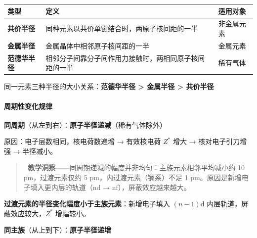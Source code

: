 \documentclass[a4paper,11pt]{ctexart}
\newcounter{none}
\begin{document}
{\def\LTcaptype{none} %
\begin{longtable}[]{@{}
  >{\raggedright\arraybackslash}p{}
  >{\raggedright\arraybackslash}p{}
  >{\raggedright\arraybackslash}p{}@{}}
\toprule\noalign{}
\begin{minipage}[b]{\linewidth}\raggedright
类型
\end{minipage} & \begin{minipage}[b]{\linewidth}\raggedright
定义
\end{minipage} & \begin{minipage}[b]{\linewidth}\raggedright
适用对象
\end{minipage} \\
\midrule\noalign{}
\endhead
\bottomrule\noalign{}
\endlastfoot
\textbf{共价半径} & 同种元素以共价单键结合时，两原子核间距的一半 & 非金属元素 \\
\textbf{金属半径} & 金属晶体中相邻原子核间距的一半 & 金属元素 \\
\textbf{范德华半径} & 相邻分子间靠分子间作用力接触时，两相同原子核间距的一半 & 稀有气体 \\
\end{longtable}
}

同一元素三种半径的大小关系：\textbf{范德华半径 \textgreater{} 金属半径 \textgreater{} 共价半径}

\paragraph{周期性变化规律}\label{ux5468ux671fux6027ux53d8ux5316ux89c4ux5f8b}

\textbf{同周期}（从左到右）：\textbf{原子半径递减}（稀有气体除外）

原因：电子层数相同，核电荷数递增 → 有效核电荷 \(Z^*\) 增大 → 核对电子引力增强 → 半径减小。

\begin{quote}
🧠 \textbf{教学洞察}------同周期递减的幅度并非均匀：主族元素相邻平均减小约 10 pm，过渡元素仅约 5 pm，内过渡元素（镧系）不足 1 pm。原因是新增电子填入更内层的轨道（nd → nf），屏蔽效应越来越大。
\end{quote}

\textbf{过渡元素的半径变化幅度小于主族元素}：新增电子填入 \((n-1)\mathrm{d}\) 内层轨道，屏蔽效应较大，\(Z^*\) 增幅较小。

\textbf{同主族}（从上到下）：\textbf{原子半径递增}
\end{document}

